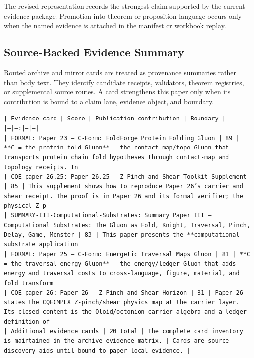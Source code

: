 \documentclass[11pt]{article}
\begin{document}
The revised representation records the strongest claim supported by the current evidence package. Promotion into theorem or proposition language occurs only when the named evidence is attached in the manifest or workbook replay.

\subsection*{Source-Backed Evidence Summary}

Routed archive and mirror cards are treated as provenance summaries rather than
body text. They identify candidate receipts, validators, theorem registries, or
supplemental source routes. A card strengthens this paper only when its
contribution is bound to a claim lane, evidence object, and boundary.

\noindent\texttt{| Evidence card | Score | Publication contribution | Boundary |}\\
\noindent\texttt{|---|---:|---|---|}\\
\noindent\texttt{| FORMAL: Paper 23 — C-Form: FoldForge Protein Folding Gluon | 89 | **C = the protein fold Gluon** — the contact-map/topo Gluon that transports protein chain fold hypotheses through contact-map and topology receipts. In }\\
\noindent\texttt{| CQE-paper-26.25: Paper 26.25 - Z-Pinch and Shear Toolkit Supplement | 85 | This supplement shows how to reproduce Paper 26's carrier and shear receipt. The proof is in Paper 26 and its formal verifier; the physical Z-p}\\
\noindent\texttt{| SUMMARY-III-Computational-Substrates: Summary Paper III — Computational Substrates: The Gluon as Fold, Knight, Traversal, Pinch, Delay, Game, Monster | 83 | This paper presents the **computational substrate application}\\
\noindent\texttt{| FORMAL: Paper 25 — C-Form: Energetic Traversal Maps Gluon | 81 | **C = the traversal energy Gluon** — the energy/ledger Gluon that adds energy and traversal costs to cross-language, figure, material, and fold transform}\\
\noindent\texttt{| CQE-paper-26: Paper 26 - Z-Pinch and Shear Horizon | 81 | Paper 26 states the CQECMPLX Z-pinch/shear physics map at the carrier layer. Its closed content is the Oloid/octonion carrier algebra and a ledger definition of}\\
\noindent\texttt{| Additional evidence cards | 20 total | The complete card inventory is maintained in the archive evidence matrix. | Cards are source-discovery aids until bound to paper-local evidence. |}\\
\end{document}
